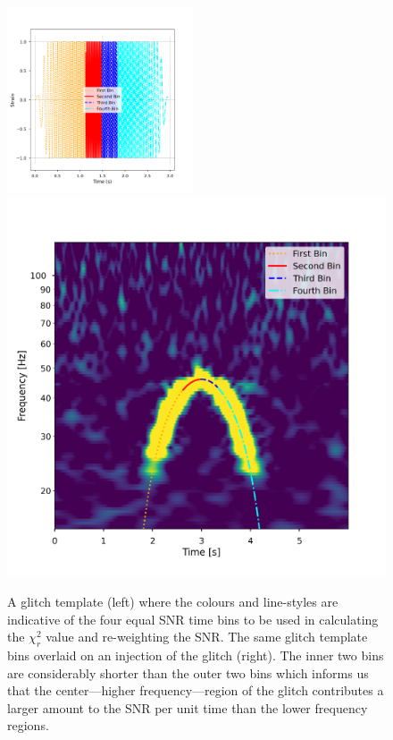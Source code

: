 \begin{figure}
  \centering
  \begin{minipage}[t]{1.0\linewidth}
  \includegraphics[width=0.49\textwidth]{images/4_archenemy/Section3/3.4/split_bins.pdf}
  \hspace{0.01\linewidth}
  \includegraphics[width=0.49\linewidth]{images/4_archenemy/Section3/3.4/split_bins_qscan.pdf}
  \end{minipage}
  \caption{A \scl{} glitch template (left) where the colours and line-styles are indicative of the four equal SNR time bins to be used in calculating the $\chi_{r}^{2}$ value and re-weighting the SNR. The same \scl{} glitch template bins overlaid on an injection of the \scl{} glitch (right). The inner two bins are considerably shorter than the outer two bins which informs us that the center---higher frequency---region of the \scl{} glitch contributes a larger amount to the SNR per unit time than the lower frequency regions.}
  \label{4:fig:split_temp_subplot}
\end{figure}

